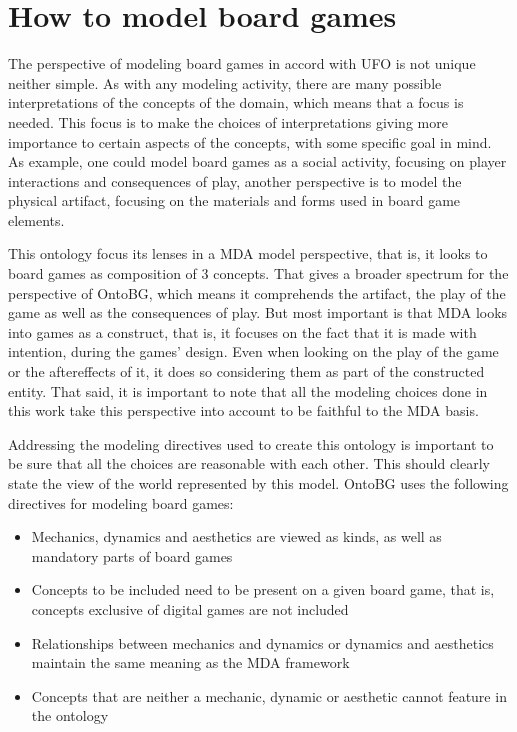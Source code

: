 \section{How to model board games} 

The perspective of modeling board games in accord with UFO is not unique neither simple. As with any modeling activity, there are many possible interpretations of the concepts of the domain, which means that a focus is needed. This focus is to make the choices of interpretations giving more importance to certain aspects of the concepts, with some specific goal in mind. As example, one could model board games as a social activity, focusing on player interactions and consequences of play, another perspective is to model the physical artifact, focusing on the materials and forms used in board game elements.

This ontology focus its lenses in a MDA model perspective, that is, it looks to board games as composition of 3 concepts. That gives a broader spectrum for the perspective of OntoBG, which means it comprehends the artifact, the play of the game as well as the consequences of play. But most important is that MDA looks into games as a construct, that is, it focuses on the fact that it is made with intention, during the games' design. Even when looking on the play of the game or the aftereffects of it, it does so considering them as part of the constructed entity. That said, it is important to note that all the modeling choices done in this work take this perspective into account to be faithful to the MDA basis. 



Addressing the modeling directives used to create this ontology is important to be sure that all the choices are reasonable with each other. This should clearly state the view of the world represented by this model. OntoBG uses the following directives for modeling board games:

\begin{itemize}
    \item Mechanics, dynamics and aesthetics are viewed as kinds, as well as mandatory parts of board games
    \item Concepts to be included need to be present on a given board game, that is, concepts exclusive of digital games are not included
    \item Relationships between mechanics and dynamics or dynamics and aesthetics maintain the same meaning as the MDA framework
    \item Concepts that are neither a mechanic, dynamic or aesthetic cannot feature in the ontology
\end{itemize}

